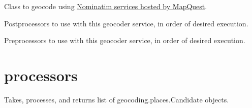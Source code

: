 \documentclass[letterpaper,10pt,english]{sphinxmanual}
\begin{document}

\begin{fulllineitems}
\label{index:omgeo.services.Nominatim}
Class to geocode using \href{http://open.mapquestapi.com/nominatim/}{Nominatim services hosted 
by MapQuest}.

\begin{fulllineitems}
\label{index:omgeo.services.Nominatim.DEFAULT_POSTPROCESSORS}
Postprocessors to use with this geocoder service, in order of desired execution.

\end{fulllineitems}


\begin{fulllineitems}
\label{index:omgeo.services.Nominatim.DEFAULT_PREPROCESSORS}
Preprocessors to use with this geocoder service, in order of desired execution.

\end{fulllineitems}


\end{fulllineitems}



\chapter{processors}
\label{index:module-omgeo.processors}\label{index:processors}

\begin{fulllineitems}
\label{index:omgeo.processors.PostProcessor}
Takes, processes, and returns list of geocoding.places.Candidate objects.

\end{fulllineitems}
\end{document}
